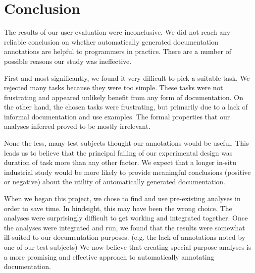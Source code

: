 \section{Conclusion}

The results of our user evaluation were inconclusive.  We did not reach any reliable conclusion on whether automatically generated documentation annotations are helpful to programmers in practice.  There are a number of possible reasons our study was ineffective.

First and most significantly, we found it very difficult to pick a suitable task.  We rejected many tasks because they were too simple.  These tasks were not frustrating and appeared unlikely benefit from any form of documentation.  On the other hand, the chosen tasks were frustrating, but primarily due to a lack of informal documentation and use examples.  The formal properties that our analyses inferred proved to be mostly irrelevant.

None the less, many test subjects thought our annotations would be useful.  This leads us to believe that the principal failing of our experimental design was duration of task more than any other factor.  We expect that a longer in-situ industrial study would be more likely to provide meaningful conclusions (positive or negative) about the utility of automatically generated documentation.

When we began this project, we chose to find and use pre-existing analyses in order to save time.  In hindsight, this may have been the wrong choice.  The analyses were surprisingly difficult to get working and integrated together.  Once the analyses were integrated and run, we found that the results were somewhat ill-suited to our documentation purposes. (e.g. the lack of \@Nullable annotations noted by one of our test subjects) We now believe that creating special purpose analyses is a more promising and effective approach to automatically annotating documentation.

